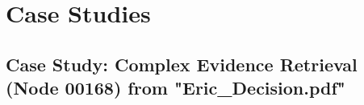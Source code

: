 \documentclass{article}
\begin{document}

\appendix
\section{Case Studies}
\label{Appendix}
\subsection{Case Study: Complex Evidence Retrieval (Node 00168) from "Eric\_Decision.pdf"}
\end{document}
